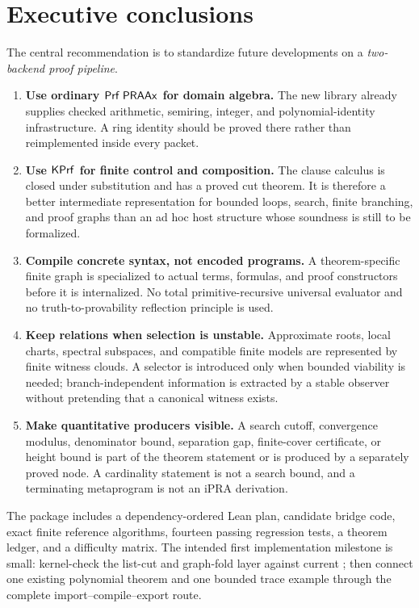 \section*{Executive conclusions}

The central recommendation is to standardize future developments on a
\emph{two-backend proof pipeline}.

\begin{enumerate}[label=\textbf{E\arabic*.}]
\item \textbf{Use ordinary \(\mathsf{Prf}\;\mathsf{PRAAx}\) for domain algebra.}
The new  library already supplies checked arithmetic,
semiring, integer, and polynomial-identity infrastructure.  A ring identity
should be proved there rather than reimplemented inside every packet.

\item \textbf{Use \(\mathsf{KPrf}\) for finite control and composition.}
The clause calculus is closed under substitution and has a proved cut theorem.
It is therefore a better intermediate representation for bounded loops,
search, finite branching, and proof graphs than an ad hoc host structure whose
soundness is still to be formalized.

\item \textbf{Compile concrete syntax, not encoded programs.}
A theorem-specific finite graph is specialized to actual terms, formulas, and
proof constructors before it is internalized.  No total primitive-recursive
universal evaluator and no truth-to-provability reflection principle is used.

\item \textbf{Keep relations when selection is unstable.}
Approximate roots, local charts, spectral subspaces, and compatible finite
models are represented by finite witness clouds.  A selector is introduced only
when bounded viability is needed; branch-independent information is extracted
by a stable observer without pretending that a canonical witness exists.

\item \textbf{Make quantitative producers visible.}
A search cutoff, convergence modulus, denominator bound, separation gap,
finite-cover certificate, or height bound is part of the theorem statement or
is produced by a separately proved node.  A cardinality statement is not a
search bound, and a terminating metaprogram is not an iPRA derivation.
\end{enumerate}

The package includes a dependency-ordered Lean plan, candidate bridge code,
exact finite reference algorithms, fourteen passing regression tests, a theorem
ledger, and a difficulty matrix.  The intended first implementation milestone
is small: kernel-check the list-cut and graph-fold layer against current
; then connect one existing
 polynomial theorem and one bounded trace example through
the complete import--compile--export route.
